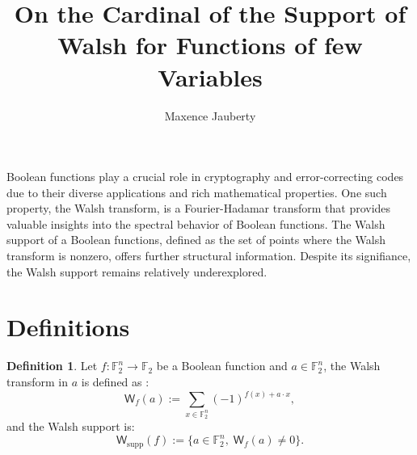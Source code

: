 \documentclass[12pt]{article}
\title{On the Cardinal of the Support of Walsh for Functions of few Variables}
\author{Maxence Jauberty}
\theoremstyle{definition}
\newtheorem{definition}[theorem]{Definition}
\newcommand{\F}{\mathbb{F}}
\newcommand{\W}{\mathsf{W}}
\begin{document}
\maketitle
Boolean functions play a crucial role in cryptography and error-correcting codes due to their
diverse applications and rich mathematical properties. One such property, the Walsh 
transform, is a Fourier-Hadamar transform that provides valuable insights into the 
spectral behavior of Boolean functions. The Walsh support of a Boolean functions, defined 
as the set of points where the Walsh transform is nonzero, offers further structural information.
Despite its signifiance, the Walsh support remains relatively underexplored.
\section{Definitions}
\begin{definition} Let \(f : \F^n_2 \to \F_2\) be a Boolean function and \(a\in \F_2^n\), 
    the Walsh transform in \(a\) is defined as :
    \begin{equation*}
        \W_f(a) := \sum_{x\in\F_2^n}(-1)^{f(x)+a\cdot x},
    \end{equation*}
    and the Walsh support is:
    \begin{equation*}
        \W_{\mathrm{supp}}(f) := \{a\in \F_2^n,\;\W_f(a)\neq 0\}.
    \end{equation*}
\end{definition}
\end{document}
